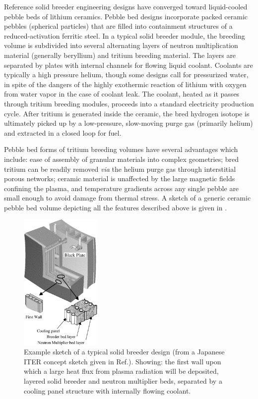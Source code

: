 Reference solid breeder engineering designs have converged toward liquid-cooled pebble beds of lithium ceramics.  Pebble bed designs incorporate packed ceramic pebbles (spherical particles) that are filled into containment structures of a reduced-activation ferritic steel. In a typical solid breeder module, the breeding volume is subdivided into several alternating layers of neutron multiplication material (generally beryllium) and tritium breeding material. The layers are separated by plates with internal channels for flowing liquid coolant. Coolants are typically a high pressure helium, though some designs call for pressurized water, in spite of the dangers of the highly exothermic reaction of lithium with oxygen from water vapor in the case of coolant leak. The coolant, heated as it passes through tritium breeding modules, proceeds into a standard electricity production cycle. After tritium is generated inside the ceramic, the bred hydrogen isotope is ultimately picked up by a low-pressure, slow-moving purge gas (primarily helium) and extracted in a closed loop for fuel. 

Pebble bed forms of tritium breeding volumes have several advantages which include: ease of assembly of granular materials into complex geometries; bred tritium can be readily removed \textit{via} the helium purge gas through interstitial porous networks; ceramic material is unaffected by the large magnetic fields confining the plasma, and temperature gradients across any single pebble are small enough to avoid damage from thermal stress. A sketch of a generic ceramic pebble bed volume depicting all the features described above is given in .\cite{Nomoto2006}

\begin{figure}[ht]
	\centering
	\includegraphics[width=0.35\textwidth]{figures/japanese-tbm} 
	\caption{Example sketch of a typical solid breeder design (from a Japanese ITER concept sketch given in Ref.\cite{Nomoto2006}). Showing: the first wall upon which a large heat flux from plasma radiation will be deposited, layered solid breeder and neutron multiplier beds, separated by a cooling panel structure with internally flowing coolant.}
	\label{fig:solid-breeder-sketch}
\end{figure}


